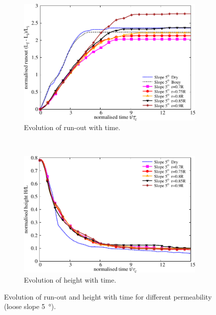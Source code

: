 \documentclass[12pt,twoside]{tuhhproc-en}
\begin{document}
\begin{figure}
\centering
\begin{subfigure}[b]{0.95\textwidth}
\centering
\includegraphics[width=0.95\columnwidth]{figs/Runout_loose_5_slope}
\caption{Evolution of run-out with time.}
\label{fig:run5}
\end{subfigure}\\
\begin{subfigure}[b]{0.95\textwidth}
\centering
\includegraphics[width=0.95\columnwidth]{figs/Height_loose_5_slope}
\caption{Evolution of height with time.}
\label{fig:height5}
\end{subfigure}
\caption{Evolution of run-out and height with time for different permeability 
(loose slope \SI{5}{\degree}).}
\label{fig:height_run_5}
\end{figure}
\end{document}
